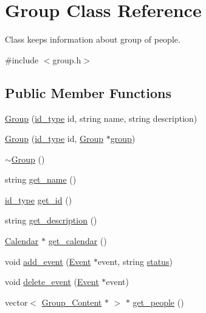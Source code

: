 \hypertarget{classGroup}{
\section{Group Class Reference}
\label{d0/db7/classGroup}
}


Class keeps information about group of people.  




{\ttfamily \#include $<$group.h$>$}

\subsection*{Public Member Functions}
\begin{DoxyCompactItemize}
\item 
\hyperlink{classGroup_ae2cf7fd2aae55c47454fa3072ccc45f1}{Group} (\hyperlink{types_8h_a0b60c08a3ab1435cccc5643d32d8ccee}{id\_\-type} id, string name, string description)
\item 
\hyperlink{classGroup_a7c5c25f4cba55a5913e93f77dc1a6fc0}{Group} (\hyperlink{types_8h_a0b60c08a3ab1435cccc5643d32d8ccee}{id\_\-type} id, \hyperlink{classGroup}{Group} $\ast$\hyperlink{group__content_8h_a27517aa1480ab2d9bfe5d62e693b33eb}{group})
\item 
\hyperlink{classGroup_aed00a22ff227ee2657ae44a5cbcedf7c}{$\sim$Group} ()
\item 
string \hyperlink{classGroup_aab2e4ec29eda3a490dede01eb9411f03}{get\_\-name} ()
\item 
\hyperlink{types_8h_a0b60c08a3ab1435cccc5643d32d8ccee}{id\_\-type} \hyperlink{classGroup_abdd86767799c3c3b6d2f7204b1945bd3}{get\_\-id} ()
\item 
string \hyperlink{classGroup_ade4eb90fbeb5f50dfb2ccb262cd39ce8}{get\_\-description} ()
\item 
\hyperlink{classCalendar}{Calendar} $\ast$ \hyperlink{classGroup_a10f85a428de5c1215fd7d319bd1a9ca3}{get\_\-calendar} ()
\item 
void \hyperlink{classGroup_abea5d93d27820a64c84792e3011f1394}{add\_\-event} (\hyperlink{classEvent}{Event} $\ast$event, string \hyperlink{group__content_8h_ab4d38e7365d935f2a5f1403eec29127e}{status})
\item 
void \hyperlink{classGroup_a70b5f6f47818f5d4912926b29faa96bf}{delete\_\-event} (\hyperlink{classEvent}{Event} $\ast$event)
\item 
vector$<$ \hyperlink{structGroup__Content}{Group\_\-Content} $\ast$ $>$ $\ast$ \hyperlink{classGroup_a8578c69459be6971dd31e76357f934dc}{get\_\-people} ()

\end{DoxyCompactItemize}
